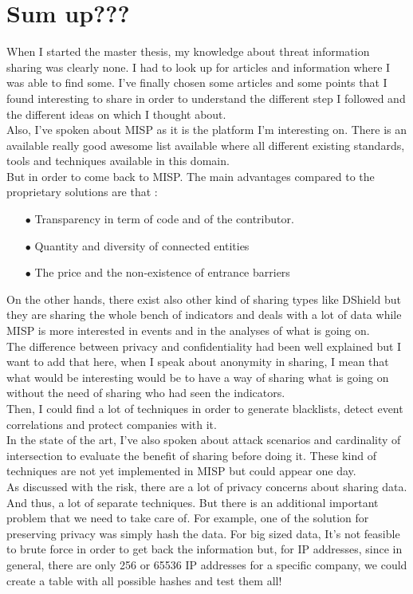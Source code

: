 \documentclass{eplmastersthesis}
\begin{document}
\section{Sum up???}
When I started the master thesis, my knowledge about threat information sharing was clearly none. I had to look up for articles and information where I was able to find some. I've finally chosen some articles and some points that I found interesting to share in order to understand the different step I followed and the different ideas on which I thought about.\\
Also, I've spoken about MISP as it is the platform I'm interesting on. There is an available really good awesome list \cite{AwesomeTreat} available where all different existing standards, tools and techniques available in this domain.\\
But in order to come back to MISP. The main advantages compared to the proprietary solutions are that :
\begin{itemize}
\item[$\bullet$] Transparency in term of code and of the contributor.
\item[$\bullet$] Quantity and diversity of connected entities
\item[$\bullet$] The price and the non-existence of entrance barriers
\end{itemize}
On the other hands, there exist also other kind of sharing types like DShield but they are sharing the whole bench of indicators and deals with a lot of data while MISP is more interested in events and in the analyses of what is going on.\\

The difference between privacy and confidentiality had been well explained but I want to add that here, when I speak about anonymity in sharing, I mean that what would be interesting would be to have a way of sharing what is going on without the need of sharing who had seen the indicators.\\
Then, I could find a lot of techniques in order to generate blacklists, detect event correlations and protect companies with it.\\
In the state of the art, I've also spoken about attack scenarios and cardinality of intersection to evaluate the benefit of sharing before doing it. These kind of techniques are not yet implemented in MISP but could appear one day.\\

As discussed with the risk, there are a lot of privacy concerns about sharing data. And thus, a lot of separate techniques. But there is an additional important problem that we need to take care of. For example, one of the solution for preserving privacy was simply hash the data. For big sized data, It's not feasible to brute force in order to get back the information but, for IP addresses, since in general, there are only 256 or 65536 IP addresses for a specific company, we could create a table with all possible hashes and test them all!\\
\end{document}
